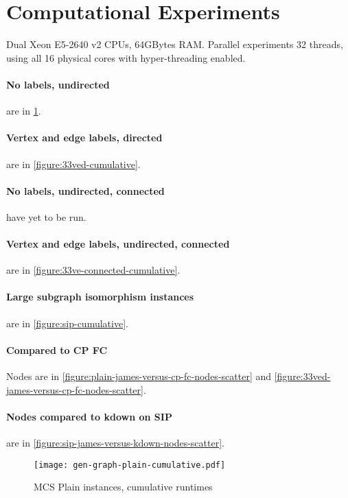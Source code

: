 \documentclass[letterpaper]{article}
\begin{document}
\section{Computational Experiments}

Dual Xeon E5-2640 v2 CPUs, 64GBytes RAM. Parallel experiments 32 threads, using
all 16 physical cores with hyper-threading enabled.

\paragraph{No labels, undirected} are in \cref{figure:plain-cumulative}.

\paragraph{Vertex and edge labels, directed} are in \cref{figure:33ved-cumulative}.

\paragraph{No labels, undirected, connected} have yet to be run.

\paragraph{Vertex and edge labels, undirected, connected} are in \cref{figure:33ve-connected-cumulative}.

\paragraph{Large subgraph isomorphism instances} are in \cref{figure:sip-cumulative}.

\paragraph{Compared to CP FC} Nodes are in \cref{figure:plain-james-versus-cp-fc-nodes-scatter} and \cref{figure:33ved-james-versus-cp-fc-nodes-scatter}.

\paragraph{Nodes compared to kdown on SIP} are in \cref{figure:sip-james-versus-kdown-nodes-scatter}.

\begin{figure}
    \centering
    \texttt{[image: gen-graph-plain-cumulative.pdf]}
    \caption{MCS Plain instances, cumulative runtimes}\label{figure:plain-cumulative}
\end{figure}
\end{document}
